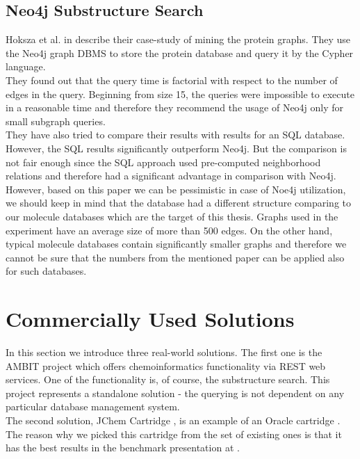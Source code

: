 \subsection{Neo4j Substructure Search}

Hoksza et al. in \cite{Hoksza} describe their case-study of mining the protein graphs. They use the Neo4j graph DBMS to store the protein database and query it by the Cypher language.\\

They found out that the query time is factorial with respect to the number of edges in the query. Beginning from size 15, the queries were impossible to execute in a reasonable time and therefore they recommend the usage of Neo4j only for small subgraph queries.\\

They have also tried to compare their results with results for an SQL database. However, the SQL results significantly outperform Neo4j. But the comparison is not fair enough since the SQL approach used pre-computed neighborhood relations and therefore had a significant advantage in comparison with Neo4j.\\

However, based on this paper we can be pessimistic in case of Noe4j utilization, we should keep in mind that the database had a different structure comparing to our molecule databases which are the target of this thesis. Graphs used in the experiment have an average size of more than 500 edges. On the other hand, typical molecule databases contain significantly smaller graphs and therefore we cannot be sure that the numbers from the mentioned paper can be applied also for such databases.

\section{Commercially Used Solutions}

In this section we introduce three real-world solutions. The first one is the AMBIT project \cite{Ambit} which offers chemoinformatics functionality via REST web services. One of the functionality is, of course, the substructure search. This project represents a standalone solution - the querying is not dependent on any particular database management system.\\

The second solution, JChem Cartridge \cite{JChem}, is an example of an Oracle cartridge \cite{cartridge}. The reason why we picked this cartridge from the set of existing ones is that it has the best results in the benchmark presentation at \cite{benchmarkPresentation}.\\


